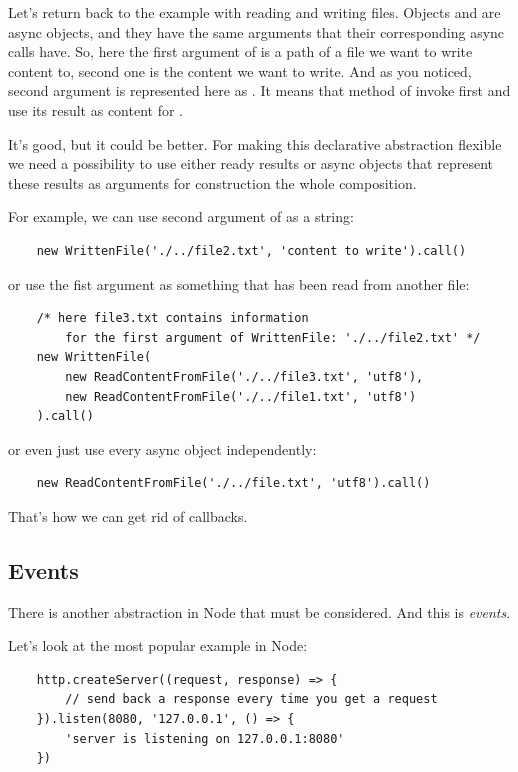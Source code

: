 \documentclass{article}
\begin{document}
Let's return back to the example with reading and writing files. Objects  and  are async objects, and they have the same arguments that their corresponding async calls have. So, here the first argument of  is a path of a file we want to write content to, second one is the content we want to write. And as you noticed, second argument is represented here as . It means that method  of  invoke first  and use its result as content for .

It's good, but it could be better. For making this declarative abstraction flexible we need a possibility to use either ready results or async objects that represent these results as arguments for construction the whole composition.

For example, we can use second argument of  as a string:


\begin{verbatim}
    new WrittenFile('./../file2.txt', 'content to write').call()
\end{verbatim}
or use the fist argument as something that has been read from another file:
\begin{verbatim}
    /* here file3.txt contains information 
        for the first argument of WrittenFile: './../file2.txt' */
    new WrittenFile(
        new ReadContentFromFile('./../file3.txt', 'utf8'), 
        new ReadContentFromFile('./../file1.txt', 'utf8')
    ).call()
\end{verbatim}
or even just use every async object independently:


\begin{verbatim}
    new ReadContentFromFile('./../file.txt', 'utf8').call()
\end{verbatim}

That's how we can get rid of callbacks.

\subsection{Events}

There is another abstraction in Node that must be considered. And this is \textit{events}.

Let's look at the most popular example in Node:

\begin{verbatim}
    http.createServer((request, response) => {
        // send back a response every time you get a request
    }).listen(8080, '127.0.0.1', () => {
        'server is listening on 127.0.0.1:8080'
    })
\end{verbatim}
\end{document}
